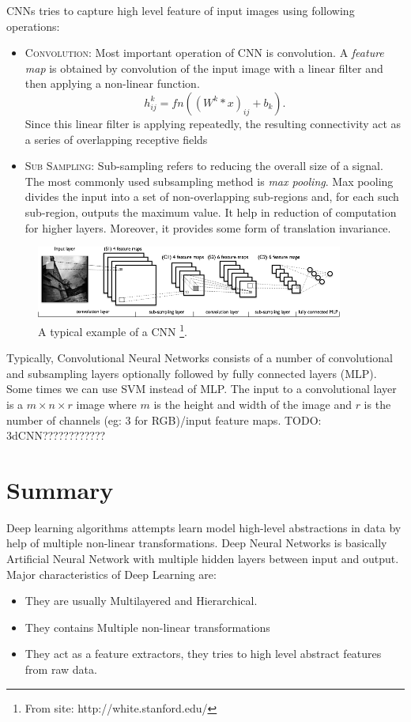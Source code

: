 \noindent CNNs tries to capture high level feature of input images using following operations:
\begin{itemize}
\item \textsc{Convolution}: Most important operation of CNN is convolution. A \textit{feature map} is obtained by convolution of the input image with a linear filter and then applying a non-linear function. 
$$h^k_{ij} = fn( (W^k * x)_{ij} + b_k ).$$
Since this linear filter is applying repeatedly, the resulting connectivity act as a series of overlapping receptive fields
\item \textsc{Sub Sampling}: Sub-sampling refers to reducing the overall size of a signal. The most commonly used subsampling method is \textit{max pooling}. Max pooling divides the input into a set of non-overlapping sub-regions and, for each such sub-region, outputs the maximum value. It help in reduction of computation for higher layers. Moreover, it provides some form of translation invariance. 
\end{itemize}

\begin{figure}[!ht]
\centering
\includegraphics[width=0.9\textwidth]{./imgs/cnn1.png} 
\caption[An example of a convolutional neural network]{A typical example of a CNN \footnote{From site: http://white.stanford.edu/}. }
\label{fig:cnn_layer}
\end{figure}

Typically, Convolutional Neural Networks consists of a number of convolutional and subsampling layers optionally followed by fully connected layers (MLP). Some times we can use SVM instead of MLP. The input to a convolutional layer is a $m \times n \times r$ image where $m$ is the height and width of the image and $r$ is the number of channels (eg: 3 for RGB)/input feature maps. 
TODO: 3dCNN????????????
\section{Summary}
Deep learning algorithms attempts learn model high-level abstractions in data by help of multiple non-linear transformations. Deep Neural Networks is basically Artificial Neural Network with multiple hidden layers between input and output. Major characteristics  of Deep Learning are:
\begin{itemize}
\item They are usually Multilayered and Hierarchical.
\item They contains Multiple non-linear transformations 
\item They act as a feature extractors, they tries to high level abstract features from raw data.
\end{itemize}

